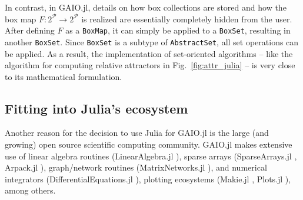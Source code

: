 \documentclass{juliacon}
\newcommand{\cP}{\mathcal{P}}
\begin{document}
\begin{enumerate}
In contrast, in GAIO.jl, details on how box collections are stored and how the box map $F:2^\cP\to 2 ^\cP$ is realized are essentially completely hidden from the user. After defining $F$ as a \texttt{BoxMap}, it can simply be applied to a \texttt{BoxSet}, resulting in another \texttt{BoxSet}. Since \texttt{BoxSet} is a subtype of \texttt{AbstractSet}, all set operations can be applied. As a result, the implementation of set-oriented algorithms -- like the algorithm for computing relative attractors in Fig.~\ref{fig:attr_julia} -- is very close to its mathematical formulation.

    
%    
%
\end{enumerate}


\subsection{Fitting into Julia's ecosystem}

Another reason for the decision to use Julia for GAIO.jl is the large (and growing) open source scientific computing community. GAIO.jl makes extensive use of linear algebra routines (LinearAlgebra.jl \cite{bezanson2017julia}), sparse arrays (SparseArrays.jl \cite{bezanson2017julia}, Arpack.jl \cite{arpack}), graph/network routines (MatrixNetworks.jl \cite{matrixnetworks}), and numerical integrators (DifferentialEquations.jl \cite{differentialequations}), plotting ecosystems (Makie.jl \cite{makie}, Plots.jl \cite{plots}), among others. 
\end{document}
